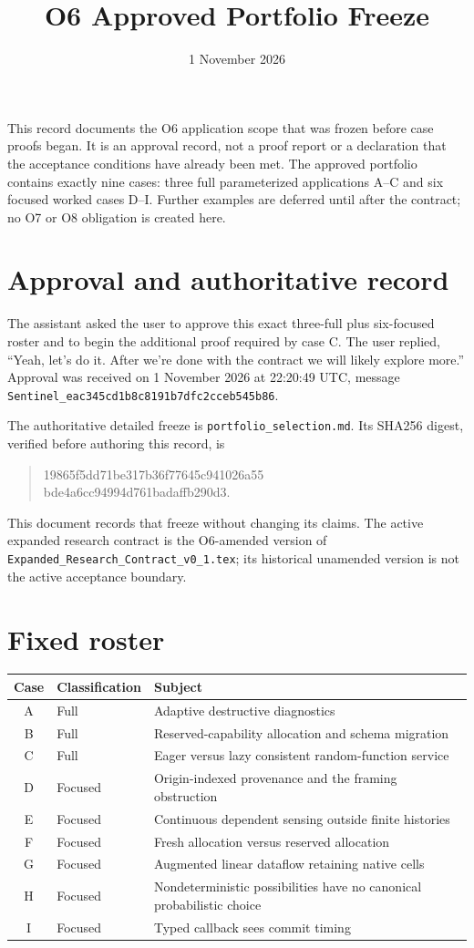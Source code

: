\documentclass[11pt,a4paper]{article}
\title{O6 Approved Portfolio Freeze}
\author{}
\date{1 November 2026}
\begin{document}
\maketitle

This record documents the O6 application scope that was frozen before
case proofs began. It is an approval record, not a proof report or a declaration that
the acceptance conditions have already been met. The approved portfolio
contains exactly nine cases: three full parameterized applications A--C
and six focused worked cases D--I. Further examples are deferred until
after the contract; no O7 or O8 obligation is created here.

\section*{Approval and authoritative record}
The assistant asked the user to approve this exact three-full plus
six-focused roster and to begin the additional proof required by case C.
The user replied, ``Yeah, let's do it. After we're done with the contract
we will likely explore more.'' Approval was received on 1 November 2026
at 22:20:49 UTC, message
\texttt{Sentinel\_eac345cd1b8c8191b7dfc2cceb545b86}.

The authoritative detailed freeze is \texttt{portfolio\_selection.md}.
Its SHA256 digest, verified before authoring this record, is
\begin{quote}\small\ttfamily
19865f5dd71be317b36f77645c941026a55\\
bde4a6cc94994d761badaffb290d3.
\end{quote}
This document records that freeze without changing its claims. The active
expanded research contract is the O6-amended version of
\texttt{Expanded\_Research\_Contract\_v0\_1.tex}; its historical unamended
version is not the active acceptance boundary.

\section*{Fixed roster}
\begin{tabular}{@{}clp{105mm}@{}}
\toprule
Case & Classification & Subject\\
\midrule
A & Full & Adaptive destructive diagnostics\\
B & Full & Reserved-capability allocation and schema migration\\
C & Full & Eager versus lazy consistent random-function service\\
D & Focused & Origin-indexed provenance and the framing obstruction\\
E & Focused & Continuous dependent sensing outside finite histories\\
F & Focused & Fresh allocation versus reserved allocation\\
G & Focused & Augmented linear dataflow retaining native cells\\
H & Focused & Nondeterministic possibilities have no canonical probabilistic choice\\
I & Focused & Typed callback sees commit timing\\
\bottomrule
\end{tabular}
\end{document}
